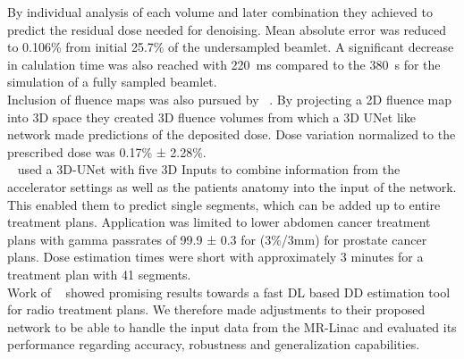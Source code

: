 By individual analysis of each volume and later combination they achieved to predict the residual dose needed for denoising.
Mean absolute error was reduced to 0.106\% from initial 25.7\% of the undersampled beamlet.
A significant decrease in calulation time was also reached with 220~ms compared to the 380~s for the simulation of a fully sampled beamlet.\\
Inclusion of fluence maps was also pursued by \citeauthor{fan_data-driven_2020}~\cite{fan_data-driven_2020}. 
By projecting a 2D fluence map into 3D space they created 3D fluence volumes from which a 3D UNet like network made predictions of the deposited dose.
Dose variation normalized to the prescribed dose was 0.17\% ± 2.28\%.\\
\citeauthor{kontaxis_deepdose_2020}~\cite{kontaxis_deepdose_2020} used a 3D-UNet with five 3D Inputs to combine information from the accelerator settings as well as the patients anatomy into the input of the network.
This enabled them to predict single segments, which can be added up to entire treatment plans.
Application was limited to lower abdomen cancer treatment plans with gamma passrates of 99.9 ± 0.3 for (3\%/3mm) for prostate cancer plans.
Dose estimation times were short with approximately 3 minutes for a treatment plan with 41 segments.\\

Work of \citeauthor{kontaxis_deepdose_2020}~\cite{kontaxis_deepdose_2020} showed promising results towards a fast \acs{DL} based \acs{DD} estimation tool for radio treatment plans.
We therefore made adjustments to their proposed network to be able to handle the input data from the MR-Linac and evaluated its performance regarding accuracy, robustness and generalization capabilities. 

